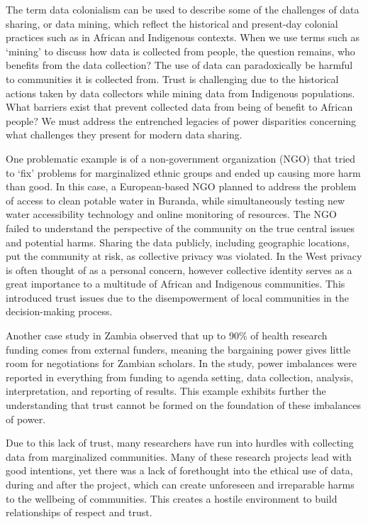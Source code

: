 \documentclass{svproc}
\begin{document}
The term data colonialism can be used to describe some of the challenges of data sharing, or data mining, which reflect the historical and present-day colonial practices such as in African and Indigenous contexts. When we use terms such as ‘mining’ to discuss how data is collected from people, the question remains, who benefits from the data collection? The use of data can paradoxically be harmful to communities it is collected from. Trust is challenging due to the historical actions taken by data collectors while mining data from Indigenous populations. What barriers exist that prevent collected data from being of benefit to African people? We must address the entrenched legacies of power disparities concerning what challenges they present for modern data sharing. \cite{Abebe2021NarrativesAfrica} 

One problematic example is of a non-government organization (NGO) that tried to ‘fix’ problems for marginalized ethnic groups and ended up causing more harm than good. In this case, a European-based NGO planned to address the problem of access to clean potable water in Buranda, while simultaneously testing new water accessibility technology and online monitoring of resources. \cite{Abebe2021NarrativesAfrica} The NGO failed to understand the perspective of the community on the true central issues and potential harms. Sharing the data publicly, including geographic locations, put the community at risk, as collective privacy was violated. In the West privacy is often thought of as a personal concern, however collective identity serves as a great importance to a multitude of African and Indigenous communities. This introduced trust issues due to the disempowerment of local communities in the decision-making process. 

Another case study in Zambia observed that up to 90\% of health research funding comes from external funders, meaning the bargaining power gives little room for negotiations for Zambian scholars. In the study, power imbalances were reported in everything from funding to agenda setting, data collection, analysis, interpretation, and reporting of results. \cite{Abebe2021NarrativesAfrica} This example exhibits further the understanding that trust cannot be formed on the foundation of these imbalances of power. 

Due to this lack of trust, many researchers have run into hurdles with collecting data from marginalized communities. Many of these research projects lead with good intentions, yet there was a lack of forethought into the ethical use of data, during and after the project, which can create unforeseen and irreparable harms to the wellbeing of communities. This creates a hostile environment to build relationships of respect and trust. \cite{Abebe2021NarrativesAfrica}
\end{document}
